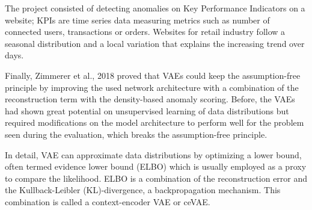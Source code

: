 The project consisted of detecting anomalies on Key Performance Indicators on a website; KPIs are time series data measuring metrics such as number of connected users, transactions or orders. Websites for retail industry follow a seasonal distribution and a local variation that explains the increasing trend over days.

Finally, Zimmerer et al., 2018 proved that VAEs could keep the assumption-free principle by improving the used network architecture with a combination of the reconstruction term with the density-based anomaly scoring. Before, the VAEs had shown great potential on unsupervised learning of data distributions but required modifications on the model architecture to perform well for the problem seen during the evaluation, which breaks the assumption-free principle. 

In detail, VAE can approximate data distributions by optimizing a lower bound, often termed evidence lower bound (ELBO) which is usually employed as a proxy to compare the likelihood. ELBO is a combination of the reconstruction error and the Kullback-Leibler (KL)-divergence, a backpropagation mechanism. This combination is called a context-encoder VAE or ceVAE.
